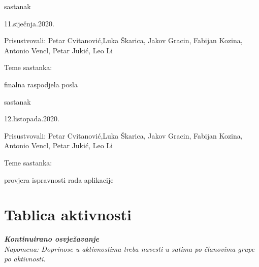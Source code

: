 \begin{packed_enum}
			\item  sastanak
			\item[] \begin{packed_item}
					\item 11.siječnja.2020.
				\item Prisustvovali: Petar Cvitanović,Luka Škarica, Jakov Gracin, Fabijan Kozina, Antonio Vencl, Petar Jukić, Leo Li
				\item Teme sastanka:
				\begin{packed_item}
					\item  finalna raspodjela posla
				\end{packed_item}
			\end{packed_item}
			
			\item  sastanak
			\item[] \begin{packed_item}
					\item 12.listopada.2020.
				\item Prisustvovali: Petar Cvitanović,Luka Škarica, Jakov Gracin, Fabijan Kozina, Antonio Vencl, Petar Jukić, Leo Li
				\item Teme sastanka:
				\begin{packed_item}
					\item  provjera ispravnosti rada aplikacije
				\end{packed_item}
			\end{packed_item}
			
			
		\end{packed_enum}
		
		\eject
		\section*{Tablica aktivnosti}
		
			\textbf{\textit{Kontinuirano osvježavanje}}\\
			
			 \textit{Napomena: Doprinose u aktivnostima treba navesti u satima po članovima grupe po aktivnosti.}
					
						
			
